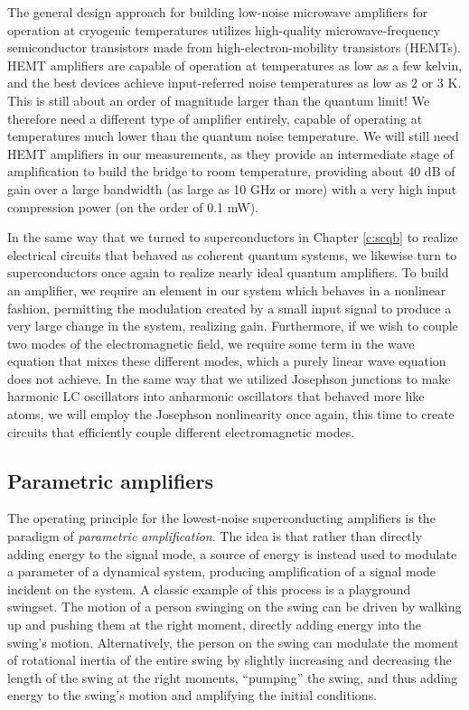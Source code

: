 The general design approach for building low-noise microwave amplifiers for operation at cryogenic temperatures utilizes high-quality microwave-frequency semiconductor transistors \cite{Wadefalk2003} made from high-electron-mobility transistors (HEMTs).  HEMT amplifiers are capable of operation at temperatures as low as a few kelvin, and the best devices achieve input-referred noise temperatures as low as 2 or 3 K.  This is still about an order of magnitude larger than the quantum limit!  We therefore need a different type of amplifier entirely, capable of operating at temperatures much lower than the quantum noise temperature.  We will still need HEMT amplifiers in our measurements, as they provide an intermediate stage of amplification to build the bridge to room temperature, providing about 40 dB of gain over a large bandwidth (as large as 10 GHz or more) with a very high input compression power (on the order of 0.1 mW).

In the same way that we turned to superconductors in Chapter \ref{c:scqb} to realize electrical circuits that behaved as coherent quantum systems, we likewise turn to superconductors once again to realize nearly ideal quantum amplifiers.  To build an amplifier, we require an element in our system which behaves in a nonlinear fashion, permitting the modulation created by a small input signal to produce a very large change in the system, realizing gain.  Furthermore, if we wish to couple two modes of the electromagnetic field, we require some term in the wave equation that mixes these different modes, which a purely linear wave equation does not achieve.  In the same way that we utilized Josephson junctions to make harmonic LC oscillators into anharmonic oscillators that behaved more like atoms, we will employ the Josephson nonlinearity once again, this time to create circuits that efficiently couple different electromagnetic modes.

\subsection{Parametric amplifiers}

The operating principle for the lowest-noise superconducting amplifiers is the paradigm of \textit{parametric amplification}.  The idea is that rather than directly adding energy to the signal mode, a source of energy is instead used to modulate a parameter of a dynamical system, producing amplification of a signal mode incident on the system.  A classic example of this process is a playground swingset.  The motion of a person swinging on the swing can be driven by walking up and pushing them at the right moment, directly adding energy into the swing's motion.  Alternatively, the person on the swing can modulate the moment of rotational inertia of the entire swing by slightly increasing and decreasing the length of the swing at the right moments, ``pumping'' the swing, and thus adding energy to the swing's motion and amplifying the initial conditions.

